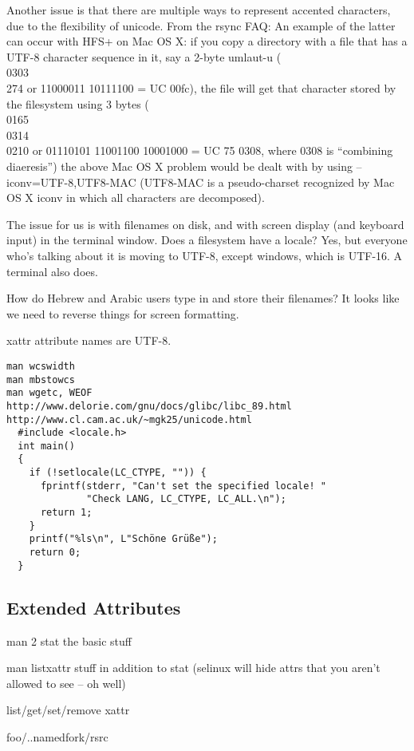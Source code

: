\documentclass{book}
\begin{document}
Another issue is that there are multiple ways to represent accented characters, due to the flexibility of unicode.
From the rsync FAQ:
	An example of the latter can occur with HFS+ on Mac OS X: if you copy a directory with a file that has a UTF-8 character sequence in it, say a 2-byte umlaut-u (\\0303\\274 or 11000011 10111100 = UC 00fc), the file will get that character stored by the filesystem using 3 bytes (\\0165\\0314\\0210 or 01110101 11001100 10001000 = UC 75 0308, where 0308 is ``combining diaeresis'')
	the above Mac OS X problem would be dealt with by using --iconv=UTF-8,UTF8-MAC (UTF8-MAC is a pseudo-charset recognized by Mac OS X iconv in which all characters are decomposed).

The issue for us is with filenames on disk, and with screen display (and keyboard input) in the terminal window.  Does a filesystem have a locale?  Yes, but everyone who's talking about it is moving to UTF-8, except windows, which is UTF-16.  A terminal also does.

How do Hebrew and Arabic users type in and store their filenames?  It looks like we need to reverse things for screen formatting.

xattr attribute names are UTF-8.

\begin{verbatim}
man wcswidth
man mbstowcs
man wgetc, WEOF
http://www.delorie.com/gnu/docs/glibc/libc_89.html
http://www.cl.cam.ac.uk/~mgk25/unicode.html
  #include <locale.h>
  int main()
  {
    if (!setlocale(LC_CTYPE, "")) {
      fprintf(stderr, "Can't set the specified locale! "
              "Check LANG, LC_CTYPE, LC_ALL.\n");
      return 1;
    }
    printf("%ls\n", L"Schöne Grüße");
    return 0;
  }
\end{verbatim}



\subsection{Extended Attributes}

man 2 stat	the basic stuff

man listxattr	stuff in addition to stat (selinux will hide attrs that you aren't allowed to see -- oh well)

list/get/set/remove xattr

foo/..namedfork/rsrc
\end{document}
